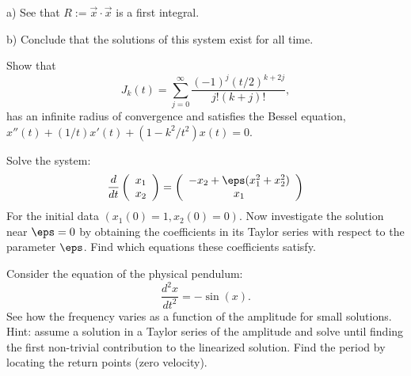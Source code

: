 a) See that $R:= \vec{x}\cdot\vec{x}$ is a first integral.

b) Conclude that the solutions of this system exist for all time.
\epro


\bpro[Strichartz]
Show that 
\begin{equation}
  \label{eq:Bessel}
  J_k(t) = \sum_{j=0}^{\infty} \frac{(-1)^j(t/2)^{k+2j}}{j!(k+j)!},
\end{equation}
%
has an infinite radius of convergence and satisfies the Bessel equation,
$x''(t) + (1/t)x'(t) + (1-k^2/t^2)x(t) = 0$.
\epro



\bpro
Solve the system:
\begin{equation}
  \frac{d}{dt}\left(
    \begin{array}{c}
      x_1 \\ x_2
    \end{array}
  \right) = 
    \left(
      \begin{array}{c}
        -x_2 + \eps(x_1^2 + x_2^2) \\
        x_1
      \end{array}
    \right) 
\end{equation}
For the initial data $(x_1(0) = 1, x_2(0) = 0)$. Now investigate 
the solution near $\eps=0$ by obtaining the coefficients in its Taylor series 
with respect to the parameter $\eps$.
Find which equations these coefficients satisfy.
\epro

\bpro[Arnold]
Consider the equation of the physical pendulum: 
\[
\frac{d^2 x}{dt^2} = -\sin(x).
\]
See how the frequency varies as a function of the amplitude for 
small solutions. Hint: assume a solution in a Taylor series of
the amplitude and solve until finding the first non-trivial contribution
to the linearized solution. 
Find the period by locating the return points (zero velocity).
\epro

 


